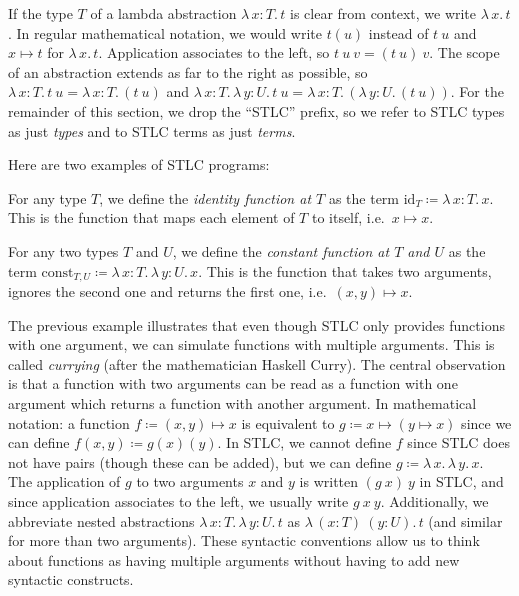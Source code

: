 \documentclass{scrartcl}
\theoremstyle{definition}
\newcommand{\id}{\mathrm{id}}
\newcommand{\const}{\mathrm{const}}
\newcommand{\Lam}[2]{λ\,#1.\, #2}
\begin{document}
If the type $T$ of a lambda abstraction $\Lam{x : T}{t}$ is clear from context, we write $\Lam{x}{t}$.
In regular mathematical notation, we would write $t(u)$ instead of $t~u$ and $x ↦ t$ for $\Lam{x}{t}$.
Application associates to the left, so $t~u~v = (t~u)~v$.
The scope of an abstraction extends as far to the right as possible, so $\Lam{x : T}{t~u} = \Lam{x : T}{(t~u)}$ and $\Lam{x : T}{\Lam{y : U}{t~u}} = \Lam{x : T}{(\Lam{y : U}{(t~u)})}$.
For the remainder of this section, we drop the \enquote{STLC} prefix, so we refer to STLC types as just \emph{types} and to STLC terms as just \emph{terms}.

Here are two examples of STLC programs:

\begin{example}
  For any type $T$, we define the \emph{identity function at $T$} as the term $\id_{T} \coloneqq \Lam{x : T}{x}$.
  This is the function that maps each element of $T$ to itself, i.e.\ $x \mapsto x$.
\end{example}

\begin{example}
  For any two types $T$ and $U$, we define the \emph{constant function at $T$ and $U$} as the term $\const_{T,U} \coloneqq \Lam{x : T}{\Lam{y : U}{x}}$.
  This is the function that takes two arguments, ignores the second one and returns the first one, i.e.\ $(x, y) ↦ x$.
\end{example}

The previous example illustrates that even though STLC only provides functions with one argument, we can simulate functions with multiple arguments.
This is called \emph{currying} (after the mathematician Haskell Curry).
The central observation is that a function with two arguments can be read as a function with one argument which returns a function with another argument.
In mathematical notation: a function $f \coloneqq (x, y) ↦ x$ is equivalent to $g \coloneqq x ↦ (y ↦ x)$ since we can define $f(x, y) \coloneqq g(x)(y)$.
In STLC, we cannot define $f$ since STLC does not have pairs (though these can be added), but we can define $g \coloneqq \Lam{x}{\Lam{y}{x}}$.
The application of $g$ to two arguments $x$ and $y$ is written $(g~x)~y$ in STLC, and since application associates to the left, we usually write $g~x~y$.
Additionally, we abbreviate nested abstractions $\Lam{x : T}{\Lam{y : U}{t}}$ as $\Lam{(x : T)~(y : U)}{t}$ (and similar for more than two arguments).
These syntactic conventions allow us to think about functions as having multiple arguments without having to add new syntactic constructs.
\end{document}

